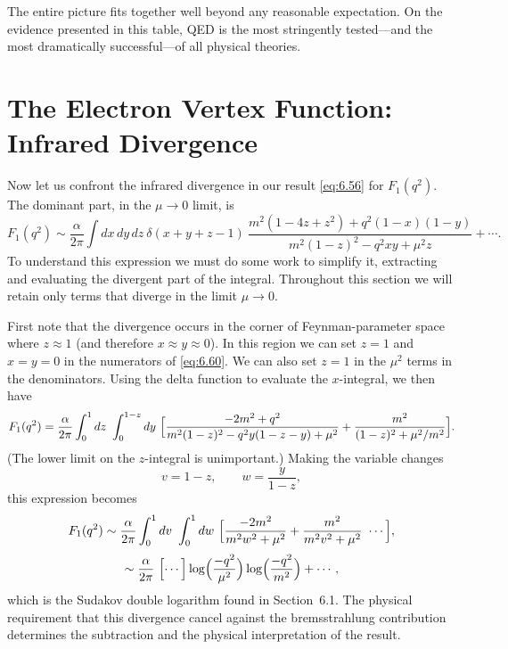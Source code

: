 The entire picture fits together well beyond any reasonable expectation.  On
the evidence presented in this table, QED is the most stringently tested---and
the most dramatically successful---of all physical theories.

\section{The Electron Vertex Function: Infrared Divergence}

Now let us confront the infrared divergence in our result \eqref{eq:6.56} for
$F_1(q^2)$.  The dominant part, in the $\mu\to 0$ limit, is
\begin{equation}
  F_1(q^2) \sim \frac{\alpha}{2\pi}\int dx\,dy\,dz\ \delta(x+y+z-1)\
    \frac{m^2(1-4z+z^2) + q^2(1-x)(1-y)}
      {m^2(1-z)^2 - q^2xy + \mu^2z}
    + \cdots .
  \label{eq:6.60}
\end{equation}
To understand this expression we must do some work to simplify it, extracting
and evaluating the divergent part of the integral.  Throughout this section we
will retain only terms that diverge in the limit $\mu\to 0$.

First note that the divergence occurs in the corner of Feynman-parameter space
where $z\approx 1$ (and therefore $x\approx y\approx 0$).  In this region we
can set $z = 1$ and $x = y = 0$ in the numerators of \eqref{eq:6.60}.  We can
also set $z = 1$ in the $\mu^2$ terms in the denominators.  Using the delta
function to evaluate the $x$-integral, we then have
\begin{equation}
  F_1(q^2) = \frac{\alpha}{2\pi}\int_0^1 dz\ \int_0^{1-z} dy\
    \Bigl[ \frac{-2m^2 + q^2}{m^2(1-z)^2 - q^2y(1-z-y) + \mu^2}
      + \frac{m^2}{(1-z)^2 + \mu^2/m^2} \Bigr].
\end{equation}
(The lower limit on the $z$-integral is unimportant.)  Making the variable
changes
\begin{equation}
  v = 1 - z,\qquad w = \frac{y}{1-z},
\end{equation}
this expression becomes
\begin{equation}
  F_1(q^2) \sim \frac{\alpha}{2\pi}\int_0^1 dv\
    \int_0^1 dw\ \Bigl[ \frac{-2m^2}{m^2w^2 + \mu^2}
      + \frac{m^2}{m^2v^2 + \mu^2}\ \cdots \Bigr],
\end{equation}
\begin{equation}
  \sim \frac{\alpha}{2\pi}\ \Bigl[ \cdots \Bigr]
    \log\Bigl( \frac{-q^2}{\mu^2} \Bigr)\log\Bigl( \frac{-q^2}{m^2}
      \Bigr) + \cdots ,
  \label{eq:6.61}
\end{equation}
which is the Sudakov double logarithm found in Section~6.1.  The physical
requirement that this divergence cancel against the bremsstrahlung
contribution determines the subtraction and the physical interpretation of
the result.

